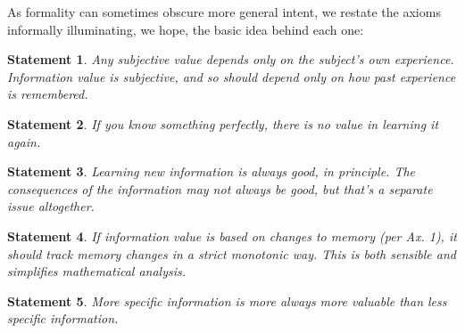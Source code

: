 \documentclass[9pt,twocolumn,twoside]{pnas-new}
\newtheorem{axiom}{Axiom}
\newtheorem{statement}{Statement}
\begin{document}

As formality can sometimes obscure more general intent, we restate the axioms informally illuminating, we hope, the basic idea behind each one:

\begin{statement}
    Any subjective value depends \textit{only} on the subject's own experience. Information value is subjective, and so should depend only on how past experience is remembered.
\end{statement}
\begin{statement}
    If you know something perfectly, there is no value in learning it again.
\end{statement}
\begin{statement}
    Learning new information is always good, in principle. The consequences of the information may not always be good, but that's a separate issue altogether.
\end{statement}
\begin{statement}
    If information value is based on changes to memory (per Ax. 1), it should track memory changes in a strict monotonic way. This is both sensible and simplifies mathematical analysis.
\end{statement}
\begin{statement}
    More specific information is more always more valuable than less specific information.
\end{statement}
\end{document}
